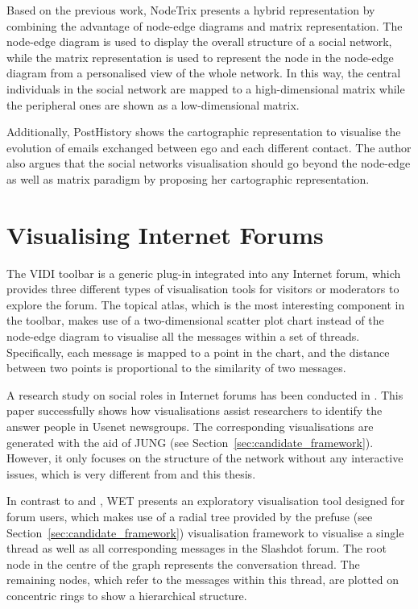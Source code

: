 Based on the previous work, NodeTrix \citep{Henry2007} presents a hybrid representation by combining the advantage of node-edge diagrams and matrix representation. The node-edge diagram is used to display the overall structure of a social network, while the matrix representation is used to represent the node in the node-edge diagram from a personalised view of the whole network. In this way, the central individuals in the social network are mapped to a high-dimensional matrix while the peripheral ones are shown as a low-dimensional matrix. 

Additionally, PostHistory \citep{Viegas2004} shows the cartographic representation to visualise the evolution of emails exchanged between ego and each different contact. The author also argues that the social networks visualisation should go beyond the node-edge as well as matrix paradigm by proposing her cartographic representation. 

\section{Visualising Internet Forums}

The VIDI toolbar \citep{Trampus2010} is a generic plug-in integrated into any Internet forum, which provides three different types of visualisation tools for visitors or moderators to explore the forum. The topical atlas, which is the most interesting component in the toolbar, makes use of a two-dimensional scatter plot chart instead of the node-edge diagram to visualise all the messages within a set of threads. Specifically, each message is mapped to a point in the chart, and the distance between two points is proportional to the similarity of two messages.

A research study on social roles in Internet forums has been conducted in \citep{Welser2007}. This paper successfully shows how visualisations assist researchers to identify the answer people in Usenet newsgroups. The corresponding visualisations are generated with the aid of JUNG (see Section~\ref{sec:candidate_framework}). However, it only focuses on the structure of the network without any interactive issues, which is very different from \citep{Chen2010a} and this thesis.

In contrast to \citep{Trampus2010} and \citep{Welser2007}, WET \citep{Pascual2007} presents an exploratory visualisation tool designed for forum users, which makes use of a radial tree provided by the prefuse (see Section~\ref{sec:candidate_framework}) visualisation framework to visualise a single thread as well as all corresponding messages in the Slashdot forum. The root node in the centre of the graph represents the conversation thread. The remaining nodes, which refer to the messages within this thread, are plotted on concentric rings to show a hierarchical structure. 

